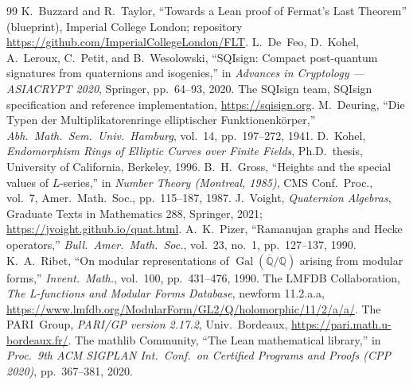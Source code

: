 \documentclass[11pt,a4paper]{article}
\theoremstyle{definition}
\begin{document}
\begin{thebibliography}{99}
 K.~Buzzard and R.~Taylor, ``Towards a Lean proof of Fermat's Last Theorem'' (blueprint), Imperial College London; repository \url{https://github.com/ImperialCollegeLondon/FLT}.
 L.~De~Feo, D.~Kohel, A.~Leroux, C.~Petit, and B.~Wesolowski, ``SQIsign: Compact post-quantum signatures from quaternions and isogenies,'' in \emph{Advances in Cryptology --- ASIACRYPT 2020}, Springer, pp.~64--93, 2020.
 The SQIsign team, SQIsign specification and reference implementation, \url{https://sqisign.org}.
 M.~Deuring, ``Die Typen der Multiplikatorenringe elliptischer Funktionenk\"orper,'' \emph{Abh.\ Math.\ Sem.\ Univ.\ Hamburg}, vol.~14, pp.~197--272, 1941.
 D.~Kohel, \emph{Endomorphism Rings of Elliptic Curves over Finite Fields}, Ph.D.\ thesis, University of California, Berkeley, 1996.
 B.~H.~Gross, ``Heights and the special values of $L$-series,'' in \emph{Number Theory (Montreal, 1985)}, CMS Conf.\ Proc., vol.~7, Amer.\ Math.\ Soc., pp.~115--187, 1987.
 J.~Voight, \emph{Quaternion Algebras}, Graduate Texts in Mathematics 288, Springer, 2021; \url{https://jvoight.github.io/quat.html}.
 A.~K.~Pizer, ``Ramanujan graphs and Hecke operators,'' \emph{Bull.\ Amer.\ Math.\ Soc.}, vol.~23, no.~1, pp.~127--137, 1990.
 K.~A.~Ribet, ``On modular representations of $\operatorname{Gal}(\overline{\mathbb{Q}}/\mathbb{Q})$ arising from modular forms,'' \emph{Invent.\ Math.}, vol.~100, pp.~431--476, 1990.
 The LMFDB Collaboration, \emph{The L-functions and Modular Forms Database}, newform 11.2.a.a, \url{https://www.lmfdb.org/ModularForm/GL2/Q/holomorphic/11/2/a/a/}.
 The PARI~Group, \emph{PARI/GP version 2.17.2}, Univ.\ Bordeaux, \url{https://pari.math.u-bordeaux.fr/}.
 The mathlib Community, ``The Lean mathematical library,'' in \emph{Proc.\ 9th ACM SIGPLAN Int.\ Conf.\ on Certified Programs and Proofs (CPP 2020)}, pp.~367--381, 2020.
\end{thebibliography}
\end{document}
